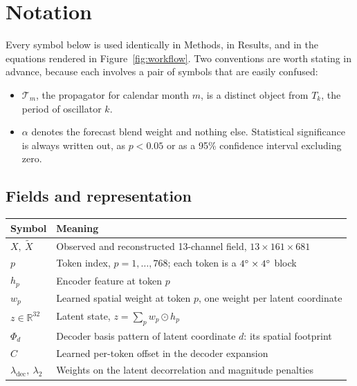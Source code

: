 \section{Notation}
\label{sec:notation}

Every symbol below is used identically in Methods, in Results, and in the equations rendered in
Figure~\ref{fig:workflow}. Two conventions are worth stating in advance, because each involves
a pair of symbols that are easily confused:
\begin{itemize}
  \item $\mathcal{T}_m$, the propagator for calendar month $m$, is a distinct object from
        $T_k$, the period of oscillator $k$.
  \item $\alpha$ denotes the forecast blend weight and nothing else. Statistical significance
        is always written out, as $p<0.05$ or as a 95\% confidence interval excluding zero.
\end{itemize}

\subsection*{Fields and representation}
\begin{center}
\begin{tabular}{@{}ll@{}}
\toprule
Symbol & Meaning \\
\midrule
$X,\ \tilde{X}$ & Observed and reconstructed 13-channel field, $13\times161\times681$ \\
$p$ & Token index, $p = 1,\dots,768$; each token is a $4^{\circ}\times4^{\circ}$ block \\
$h_p$ & Encoder feature at token $p$ \\
$w_p$ & Learned spatial weight at token $p$, one weight per latent coordinate \\
$z \in \mathbb{R}^{32}$ & Latent state, $z = \sum_p w_p \odot h_p$ \\
$\Phi_d$ & Decoder basis pattern of latent coordinate $d$: its spatial footprint \\
$C$ & Learned per-token offset in the decoder expansion \\
$\lambda_{\mathrm{dec}},\ \lambda_2$ & Weights on the latent decorrelation and magnitude
                                       penalties \\
\bottomrule
\end{tabular}
\end{center}

